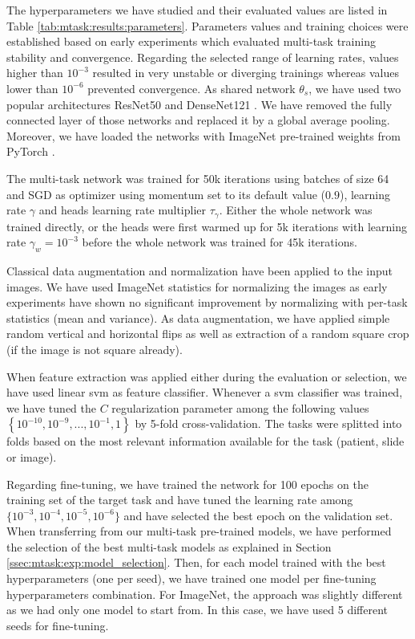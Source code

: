 The hyperparameters we have studied and their evaluated values are listed in Table \ref{tab:mtask:results:parameters}. Parameters values and training choices were established based on early experiments which evaluated multi-task training stability and convergence. Regarding the selected range of learning rates, values higher than $10^{-3}$ resulted in very unstable or diverging trainings whereas values lower than $10^{-6}$ prevented convergence. As shared network $\theta_s$, we have used two popular architectures ResNet50 \cite{he2016deep} and DenseNet121 \cite{huang2017densely}. We have removed the fully connected layer of those networks and replaced it by a global average pooling. Moreover, we have loaded the networks with ImageNet pre-trained weights from PyTorch \cite{paszke2019pytorch}.

The multi-task network was trained for 50k iterations using batches of size 64 and SGD as optimizer using momentum set to its default value (\ie $0.9$), learning rate $\gamma$ and heads learning rate multiplier $\tau_\gamma$. Either the whole network was trained directly, or the heads were first warmed up for 5k iterations with learning rate $\gamma_w = 10^{-3}$ before the whole network was trained for 45k iterations.

Classical data augmentation and normalization have been applied to the input images. We have used ImageNet statistics for normalizing the images as early experiments have shown no significant improvement by normalizing with per-task statistics (\ie mean and variance). As data augmentation, we have applied simple random vertical and horizontal flips as well as extraction of a random square crop (if the image is not square already).

When feature extraction was applied either during the evaluation or selection, we have used linear \acrshort{svm} \cite{fan2008liblinear} as feature classifier. Whenever a \acrshort{svm} classifier was trained, we have tuned the $C$ regularization parameter among the following values $\left\{10^{-10}, 10^{-9},...,10^{-1},1\right\}$ by 5-fold cross-validation. The tasks were splitted into folds based on the most relevant information available for the task (patient, slide or image).

Regarding fine-tuning, we have trained the network for 100 epochs on the training set of the target task and have tuned the learning rate among $\{10^{-3}, 10^{-4}, 10^{-5}, 10^{-6}\}$ and have selected the best epoch on the validation set. When transferring from our multi-task pre-trained models, we have performed the selection of the best multi-task models as explained in Section \ref{ssec:mtask:exp:model_selection}. Then, for each model trained with the best hyperparameters (\ie one per seed), we have trained one model per fine-tuning hyperparameters combination. For ImageNet, the approach was slightly different as we had only one model to start from. In this case, we have used 5 different seeds for fine-tuning. 

